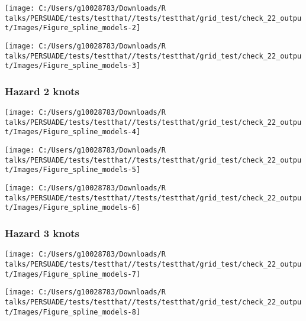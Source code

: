 \documentclass[
]{article}
\begin{document}
\begin{flushleft}\texttt{[image: C:/Users/g10028783/Downloads/R talks/PERSUADE/tests/testthat//tests/testthat/grid\_test/check\_22\_output/Images/Figure\_spline\_models-2]} \end{flushleft}

\begin{flushleft}\texttt{[image: C:/Users/g10028783/Downloads/R talks/PERSUADE/tests/testthat//tests/testthat/grid\_test/check\_22\_output/Images/Figure\_spline\_models-3]} \end{flushleft}

\clearpage

\subsubsection{Hazard 2 knots}\label{hazard-2-knots}

\begin{flushleft}\texttt{[image: C:/Users/g10028783/Downloads/R talks/PERSUADE/tests/testthat//tests/testthat/grid\_test/check\_22\_output/Images/Figure\_spline\_models-4]} \end{flushleft}

\begin{flushleft}\texttt{[image: C:/Users/g10028783/Downloads/R talks/PERSUADE/tests/testthat//tests/testthat/grid\_test/check\_22\_output/Images/Figure\_spline\_models-5]} \end{flushleft}

\begin{flushleft}\texttt{[image: C:/Users/g10028783/Downloads/R talks/PERSUADE/tests/testthat//tests/testthat/grid\_test/check\_22\_output/Images/Figure\_spline\_models-6]} \end{flushleft}

\clearpage

\subsubsection{Hazard 3 knots}\label{hazard-3-knots}

\begin{flushleft}\texttt{[image: C:/Users/g10028783/Downloads/R talks/PERSUADE/tests/testthat//tests/testthat/grid\_test/check\_22\_output/Images/Figure\_spline\_models-7]} \end{flushleft}

\begin{flushleft}\texttt{[image: C:/Users/g10028783/Downloads/R talks/PERSUADE/tests/testthat//tests/testthat/grid\_test/check\_22\_output/Images/Figure\_spline\_models-8]} \end{flushleft}
\end{document}
